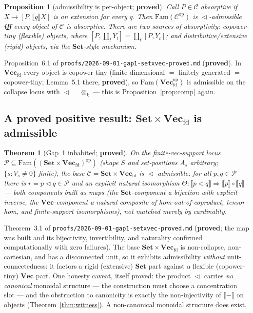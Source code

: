 \documentclass[11pt]{article}
\theoremstyle{plain}
\newtheorem{theorem}{Theorem}
\newtheorem{proposition}{Proposition}
\theoremstyle{definition}
\theoremstyle{remark}
\newcommand{\C}{\mathcal{C}}
\newcommand{\Set}{\mathbf{Set}}
\newcommand{\Vect}{\mathbf{Vec}}
\newcommand{\Vecfd}{\mathbf{Vec}_{\mathrm{fd}}}
\newcommand{\Fam}{\mathrm{Fam}}
\newcommand{\ext}[1]{\llbracket #1 \rrbracket}
\newcommand{\ihom}[2]{[#1,#2]}
\renewcommand{\lhd}{\vartriangleleft}
\newcommand{\op}{\mathrm{op}}
\begin{document}
\begin{proposition}[admissibility is per-object; \textbf{proved}]
\label{prop:absorptive}
Call $P\in\C$ \emph{absorptive} if $X\mapsto\ihom{P}{\ext{q}X}$ is an extension for every $q$. Then
$\Fam(\C^\op)$ is $\lhd$-admissible \textbf{iff} every object of $\C$ is absorptive. There are two
sources of absorptivity: \emph{copower-tiny} (flexible) objects, where $\ihom{P}{\coprod_t
Y_t}=\coprod_t\ihom{P}{Y_t}$; and \emph{distributive/extensive} (rigid) objects, via the $\Set$-style
mechanism.
\end{proposition}

\noindent Proposition~6.1 of \texttt{proofs/2026-09-01-gap1-setxvec-proved.md} (\textbf{proved}). In
$\Vecfd$ every object is copower-tiny (finite-dimensional $=$ finitely generated $=$ copower-tiny;
Lemma~5.1 there, \textbf{proved}), so $\Fam(\Vecfd^\op)$ is admissible on the collapse locus with
$\lhd=\otimes_k$ --- this is Proposition~\ref{prop:comp} again.

\subsection{A proved positive result: $\Set\times\Vecfd$ is admissible}

\begin{theorem}[Gap~1 inhabited; \textbf{proved}]
\label{thm:gap1}
On the finite-vec-support locus $\mathcal P\subseteq\Fam((\Set\times\Vecfd)^\op)$ (shape $S$ and
set-positions $A_s$ arbitrary; $\{s:V_s\neq0\}$ finite), the base $\C=\Set\times\Vecfd$ is
$\lhd$-admissible: for all $p,q\in\mathcal P$ there is $r=p\lhd q\in\mathcal P$ and an
\emph{explicit natural isomorphism} $\Theta\colon\ext{p\lhd q}\Rightarrow\ext{p}\circ\ext{q}$ ---
both components built as maps (the $\Set$-component a bijection with explicit inverse, the
$\Vect$-component a natural composite of hom-out-of-coproduct, tensor--hom, and finite-support
isomorphisms), \emph{not} matched merely by cardinality.
\end{theorem}

\noindent Theorem~3.1 of \texttt{proofs/2026-09-01-gap1-setxvec-proved.md} (\textbf{proved}; the map
was built and its bijectivity, invertibility, and naturality confirmed computationally with zero
failures). The base $\Set\times\Vecfd$ is non-collapse, non-cartesian, and has a disconnected unit,
so it exhibits admissibility \emph{without} unit-connectedness: it factors a rigid (extensive)
$\Set$ part against a flexible (copower-tiny) $\Vect$ part. One honesty caveat, itself proved: the
product $\lhd$ carries \emph{no canonical} monoidal structure --- the construction must choose a
concentration slot --- and the obstruction to canonicity is exactly the non-injectivity of
$\ext{-}$ on objects (Theorem~\ref{thm:witness}). A non-canonical monoidal structure does exist.
\end{document}
